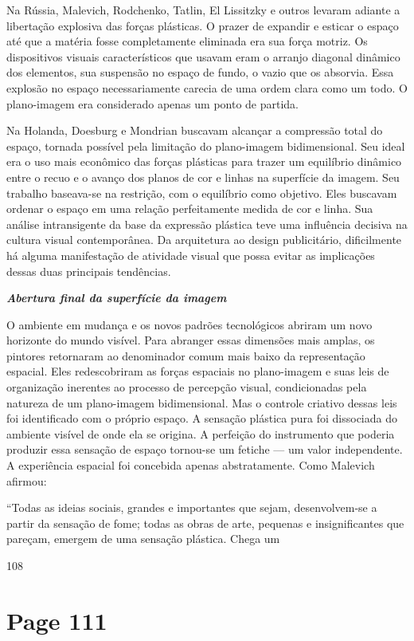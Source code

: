 \documentclass[a4paper]{article}
\begin{document}
Na Rússia, Malevich, Rodchenko, Tatlin, El Lissitzky e outros levaram adiante a libertação explosiva das forças plásticas. O prazer de expandir e esticar o espaço até que a matéria fosse completamente eliminada era sua força motriz. Os dispositivos visuais característicos que usavam eram o arranjo diagonal dinâmico dos elementos, sua suspensão no espaço de fundo, o vazio que os absorvia. Essa explosão no espaço necessariamente carecia de uma ordem clara como um todo. O plano-imagem era considerado apenas um ponto de partida.

Na Holanda, Doesburg e Mondrian buscavam alcançar a compressão total do espaço, tornada possível pela limitação do plano-imagem bidimensional. Seu ideal era o uso mais econômico das forças plásticas para trazer um equilíbrio dinâmico entre o recuo e o avanço dos planos de cor e linhas na superfície da imagem. Seu trabalho baseava-se na restrição, com o equilíbrio como objetivo. Eles buscavam ordenar o espaço em uma relação perfeitamente medida de cor e linha. Sua análise intransigente da base da expressão plástica teve uma influência decisiva na cultura visual contemporânea. Da arquitetura ao design publicitário, dificilmente há alguma manifestação de atividade visual que possa evitar as implicações dessas duas principais tendências.

\textbf{\textit{Abertura final da superfície da imagem}}

O ambiente em mudança e os novos padrões tecnológicos abriram um novo horizonte do mundo visível. Para abranger essas dimensões mais amplas, os pintores retornaram ao denominador comum mais baixo da representação espacial. Eles redescobriram as forças espaciais no plano-imagem e suas leis de organização inerentes ao processo de percepção visual, condicionadas pela natureza de um plano-imagem bidimensional. Mas o controle criativo dessas leis foi identificado com o próprio espaço. A sensação plástica pura foi dissociada do ambiente visível de onde ela se origina. A perfeição do instrumento que poderia produzir essa sensação de espaço tornou-se um fetiche --- um valor independente. A experiência espacial foi concebida apenas abstratamente. Como Malevich afirmou:

``Todas as ideias sociais, grandes e importantes que sejam, desenvolvem-se a partir da sensação de fome; todas as obras de arte, pequenas e insignificantes que pareçam, emergem de uma sensação plástica. Chega um

108

\newpage
\section*{Page 111}
\end{document}
